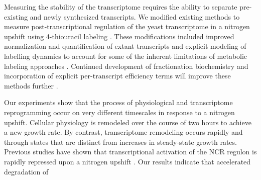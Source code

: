 Measuring the stability of the transcriptome requires the ability to
separate pre-existing and newly synthesized transcripts. We modified
existing methods to measure 
post-transcriptional regulation of the yeast transcriptome in a
nitrogen upshift using 4-thiouracil labeling
\parencite{miller2011dynamic,neymotin2014determination,munchel2011dynamic}. These
modifications included improved normalization and quantification of
extant transcripts and explicit modeling of labelling dynamics to
account for some of the inherent limitations of metabolic labeling
approaches \parencite{perez2013eukaryotic}. Continued development of
fractionation biochemistry \parencite{duffy2015tracking} and incorporation of
explicit per-transcript efficiency terms will improve these
methods further \parencite{chan2017non}.

Our experiments show that the process of physiological and 
transcriptome reprogramming occur on very different timescales in response
to a nitrogen upshift. Cellular physiology is remodeled over the
course of two hours to achieve a new growth rate.
By contrast, transcriptome remodeling occurs rapidly and through
states that are distinct
from increases in steady-state growth rates. 
Previous studies have shown that transcriptional activation of the NCR
regulon is rapidly repressed upon a nitrogen upshift
\parencite{airoldi2016steady}. Our
results indicate that accelerated degradation of 
